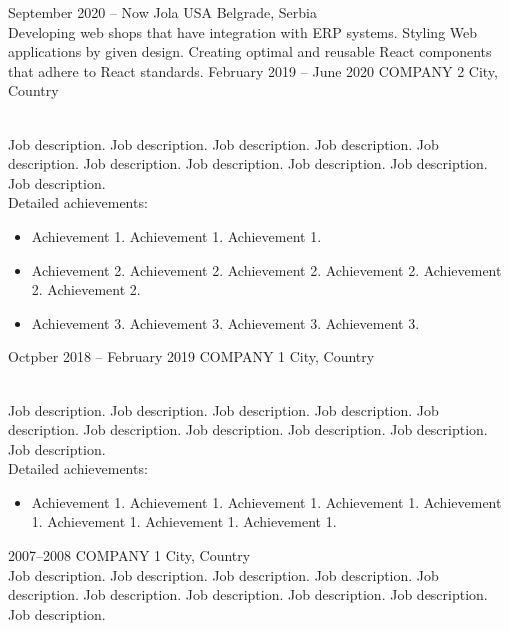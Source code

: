 \documentclass[]{cv-style}          %
\begin{document}
\begin{entrylist}
  \entry
  {September 2020 -- Now}
  {Jola USA}
  {Belgrade, Serbia}
  {\\
    Developing web shops that have integration with ERP systems. Styling Web applications by given design. Creating optimal and reusable React components that adhere to React standards.}
  \entry
  {February 2019 -- June 2020}
  {COMPANY 2}
  {City, Country}
  {\\
    Job description. Job description. Job description. Job description. Job description. Job description. Job description. Job description. Job description. Job description.\\
    Detailed achievements:
    \begin{itemize}
      \item Achievement 1. Achievement 1. Achievement 1.
      \item Achievement 2. Achievement 2. Achievement 2. Achievement 2. Achievement 2. Achievement 2.
      \item Achievement 3. Achievement 3. Achievement 3. Achievement 3.
    \end{itemize}}
  \entry
  {Octpber 2018 -- February 2019}
  {COMPANY 1}
  {City, Country}
  {\\
    Job description. Job description. Job description. Job description. Job description. Job description. Job description. Job description. Job description. Job description.\\
    Detailed achievements:
    \begin{itemize}
      \item Achievement 1. Achievement 1. Achievement 1. Achievement 1. Achievement 1. Achievement 1. Achievement 1. Achievement 1.
    \end{itemize}}
  \entry
  {2007--2008}
  {COMPANY 1}
  {City, Country}
  {\\
    Job description. Job description. Job description. Job description. Job description. Job description. Job description. Job description. Job description. Job description.\\}

\end{entrylist}
\end{document}
